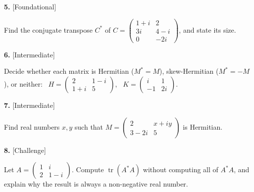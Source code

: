 \documentclass[11pt]{article}
\begin{document}
\begin{minipage}{\linewidth}\textbf{5.} \hfill{\scriptsize\color{ink}[Foundational]}\par\nopagebreak Find the conjugate transpose $C^{*}$ of $C=\begin{pmatrix}1+i&2\\3i&4-i\\0&-2i\end{pmatrix}$, and state its size.
\vspace{3.4cm}\end{minipage}\par\vspace{4pt}
\begin{minipage}{\linewidth}\textbf{6.} \hfill{\scriptsize\color{ink}[Intermediate]}\par\nopagebreak Decide whether each matrix is Hermitian ($M^{*}=M$), skew-Hermitian ($M^{*}=-M$), or neither: \ $H=\begin{pmatrix}2&1-i\\1+i&5\end{pmatrix}$, \ $K=\begin{pmatrix}i&1\\-1&2i\end{pmatrix}$.
\vspace{4.0cm}\end{minipage}\par\vspace{4pt}
\begin{minipage}{\linewidth}\textbf{7.} \hfill{\scriptsize\color{ink}[Intermediate]}\par\nopagebreak Find real numbers $x,y$ such that $M=\begin{pmatrix}2&x+iy\\3-2i&5\end{pmatrix}$ is Hermitian.
\vspace{3.4cm}\end{minipage}\par\vspace{4pt}
\begin{minipage}{\linewidth}\textbf{8.} \hfill{\scriptsize\color{ink}[Challenge]}\par\nopagebreak Let $A=\begin{pmatrix}1&i\\2&1-i\end{pmatrix}$. Compute $\operatorname{tr}(A^{*}A)$ without computing all of $A^{*}A$, and explain why the result is always a non-negative real number.
\vspace{4.0cm}\end{minipage}\par\vspace{4pt}
\end{document}
